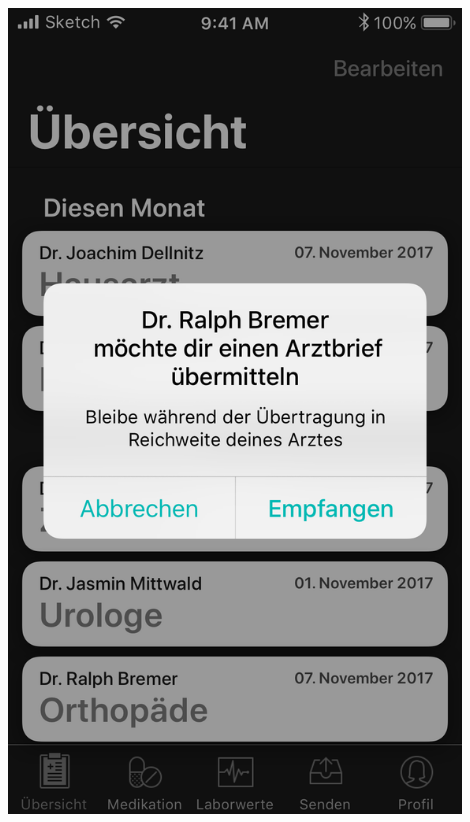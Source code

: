 \documentclass[a4paper]{scrreprt}
\begin{document}
\newpage


\begin{minipage}[t][][b]{0.4\textwidth}

\includegraphics[width=0.9\textwidth]{mockups/ReceiveData}
~\\

\end{minipage}
\end{document}
